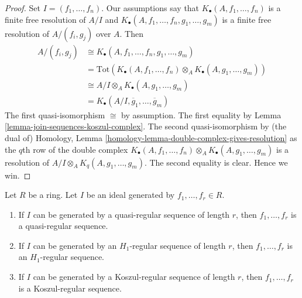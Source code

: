 \begin{proof}
Set $I = (f_1, \ldots, f_n)$.
Our assumptions say that $K_\bullet(A, f_1, \ldots, f_n)$ is a finite free
resolution of $A/I$ and
$K_\bullet(A, f_1, \ldots, f_n, g_1, \ldots, g_m)$ is a
finite free resolution of $A/(f_i, g_j)$ over $A$. Then
\begin{align*}
A/(f_i, g_j) & \cong K_\bullet(A, f_1, \ldots, f_n, g_1, \ldots, g_m) \\
& = \text{Tot}(K_\bullet(A, f_1, \ldots, f_n) \otimes_A
K_\bullet(A, g_1, \ldots, g_m)) \\
& \cong A/I \otimes_A K_\bullet(A, g_1, \ldots, g_m) \\
& = K_\bullet(A/I, \overline{g}_1, \ldots, \overline{g}_m)
\end{align*}
The first quasi-isomorphism $\cong$ by assumption. The first equality by
Lemma \ref{lemma-join-sequences-koszul-complex}.
The second quasi-isomorphism by (the dual of)
Homology, Lemma \ref{homology-lemma-double-complex-gives-resolution}
as the $q$th row of the double complex
$K_\bullet(A, f_1, \ldots, f_n) \otimes_A K_\bullet(A, g_1, \ldots, g_m)$
is a resolution of $A/I \otimes_A K_q(A, g_1, \ldots, g_m)$.
The second equality is clear. Hence we win.
\end{proof}

\begin{lemma}
\label{lemma-independence-of-generators}
Let $R$ be a ring. Let $I$ be an ideal generated by $f_1, \ldots, f_r \in R$.
\begin{enumerate}
\item If $I$ can be generated by a quasi-regular sequence of length $r$,
then $f_1, \ldots, f_r$ is a quasi-regular sequence.
\item If $I$ can be generated by an $H_1$-regular sequence of length $r$,
then $f_1, \ldots, f_r$ is an $H_1$-regular sequence.
\item If $I$ can be generated by a Koszul-regular sequence of length $r$,
then $f_1, \ldots, f_r$ is a Koszul-regular sequence.
\end{enumerate}
\end{lemma}

